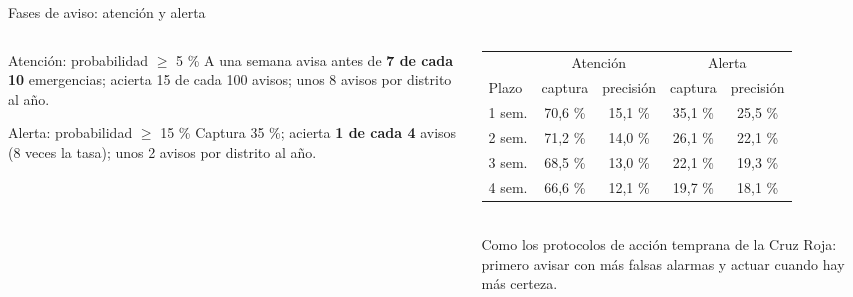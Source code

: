 \documentclass[aspectratio=169,11pt]{beamer}
\begin{document}
\begin{frame}{Fases de aviso: atención y alerta}
\begin{columns}[T]
\begin{column}{0.48\textwidth}
\begin{caja}[naranja]{Atención: probabilidad $\ge$ 5 \%}
A una semana avisa antes de \textbf{7 de cada 10} emergencias; acierta 15 de cada 100 avisos; unos 8 avisos por distrito al año.
\end{caja}
\begin{caja}[rojo]{Alerta: probabilidad $\ge$ 15 \%}
Captura 35 \%; acierta \textbf{1 de cada 4} avisos (8 veces la tasa); unos 2 avisos por distrito al año.
\end{caja}
\end{column}
\begin{column}{0.48\textwidth}\scriptsize
\begin{tabular}{@{}lcccc@{}}\toprule
 & \multicolumn{2}{c}{Atención} & \multicolumn{2}{c}{Alerta}\\
Plazo & captura & precisión & captura & precisión\\\midrule
1 sem. & 70,6 \% & 15,1 \% & 35,1 \% & 25,5 \%\\
2 sem. & 71,2 \% & 14,0 \% & 26,1 \% & 22,1 \%\\
3 sem. & 68,5 \% & 13,0 \% & 22,1 \% & 19,3 \%\\
4 sem. & 66,6 \% & 12,1 \% & 19,7 \% & 18,1 \%\\\bottomrule
\end{tabular}\\[5pt]
\small Como los protocolos de acción temprana de la Cruz Roja: primero avisar con más falsas alarmas y actuar cuando hay más certeza.
\end{column}
\end{columns}
\end{frame}
\end{document}
